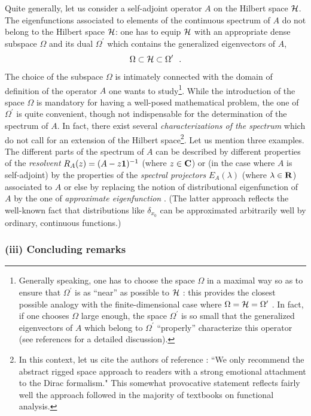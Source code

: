 \documentclass[a4wide,12pt]{report}
\begin{document}
Quite generally, let us consider a self-adjoint operator 
$A$ on the Hilbert space ${\cal H}$. The eigenfunctions 
associated to elements of the continuous spectrum of $A$
do not belong to the Hilbert space ${\cal H}$: one has to equip 
${\cal H}$ with an appropriate dense subspace $\Omega$ and its dual 
$\Omega^{\prime}$ which contains the generalized eigenvectors
of $A$, 
\[
\Omega \subset {\cal H} \subset \Omega^{\prime}
\ \ .
\]
The choice of the subspace $\Omega$ is intimately connected 
 with the domain of definition of the operator $A$
one wants to study\footnote{Generally speaking, one has to choose
the space $\Omega$ in a maximal way so as  
to ensure that $\Omega^{\prime}$ is as ``near'' as possible
to ${\cal H}$ : this provides the closest possible 
analogy with the finite-dimensional case where 
$\Omega = {\cal H} = \Omega^{\prime}$
\cite{bere,ber}. In fact, if one chooses $\Omega$ large enough,
the space $\Omega^{\prime}$ is so small that 
the generalized eigenvectors of $A$ which belong to 
$\Omega^{\prime}$ 
``properly'' characterize 
this operator (see references \cite{ber,bere} for
a detailed discussion).}. 
While the introduction of the space  $\Omega$
is mandatory for having a well-posed mathematical problem, 
the one of $\Omega^{\prime}$ is quite convenient, though not 
indispensable for the determination of the spectrum of $A$.
In fact, there exist several {\em characterizations of the spectrum} 
which do not call for an extension of the Hilbert space\footnote{In 
this context, let us cite the authors of reference \cite{rs}: 
``We only recommend the abstract
rigged space approach to readers with a strong emotional attachment
to the Dirac formalism." This somewhat provocative statement 
reflects fairly well the approach followed in the majority of
textbooks on functional analysis.}.
Let us mention three examples.
The different parts of the spectrum of $A$
can be described by different properties of the {\em resolvent}
$R_A (z) = (A - z {\bf 1})^{-1}$
(where $z \in {\bf C}$) \cite{sg,bgc} or  (in the case where $A$
is self-adjoint) by the properties of the {\em spectral projectors}
$E_A (\lambda)$ (where $\lambda \in {\bf R}$)
associated to $A$
\cite{jvn, sg, rs} 
or else by replacing the notion of distributional eigenfunction 
of $A$ by the one of {\em approximate eigenfunction}
\cite{bgc}. (The latter approach reflects the well-known fact that 
distributions like $\delta_{x_0}$ can be approximated arbitrarily well 
by ordinary, continuous functions.)

\subsubsection{(iii) Concluding remarks} 
\end{document}
